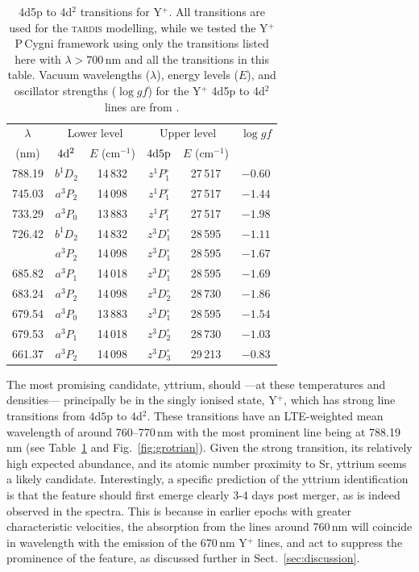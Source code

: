 \documentclass{aa}
\begin{document}
\begin{table}
\caption{4d5p to 4d\(^2\) transitions for Y\(^+\). All transitions are used for the \textsc{tardis} modelling, while we tested the Y\(^+\) P\,Cygni framework using only the transitions listed here with $\lambda>700$\,nm and all the transitions in this table. Vacuum wavelengths ($\lambda$), energy levels ($E$), and oscillator strengths ($\log{gf}$) for the Y\(^+\) 4d5p to 4d\(^2\) lines are from \citet{Biemont2011}.}\label{table:Yttrium}
\centering
\renewcommand{\arraystretch}{1.25} 
\begin{tabular}{@{}c|cc|cc|c@{}} \hline\hline %
$\lambda$ & \multicolumn{2}{|c|}{Lower level} & \multicolumn{2}{|c|}{Upper level} & $\log{gf}$ \\
 (nm) & $4{\rm d}^2$ & $E$ (cm$^{-1}$) & $4{\rm d}5{\rm p}$ & $E$ (cm$^{-1}$) & \\ \hline 
788.19  & $b^1 D_2$  & 14\,832  & $z^1 P_1^\circ$ & 27\,517 & $-0.60$ \\
745.03  & $a^3 P_2$  & 14\,098  & $z^1 P_1^\circ$ & 27\,517 & $-1.44$ \\
733.29  & $a^3 P_0$  & 13\,883  & $z^1 P_1^\circ$ & 27\,517 & $-1.98$ \\
726.42  & $b^1 D_2$  & 14\,832  & $z^3 D_1^\circ$ & 28\,595 & $-1.11$ \\[3pt]
\hdashline
689.60  & $a^3 P_2$  & 14\,098  & $z^3 D_1^\circ$ & 28\,595 & $-1.67$ \\
685.82  & $a^3 P_1$  & 14\,018  & $z^3 D_1^\circ$ & 28\,595 & $-1.69$ \\
683.24  & $a^3 P_2$  & 14\,098  & $z^3 D_2^\circ$ & 28\,730 & $-1.86$ \\ %
679.54  & $a^3 P_0$  & 13\,883  & $z^3 D_1^\circ$ & 28\,595 & $-1.54$ \\
679.53  & $a^3 P_1$  & 14\,018  & $z^3 D_2^\circ$ & 28\,730 & $-1.03$ \\ %
661.37  & $a^3 P_2$  & 14\,098  & $z^3 D_3^\circ$ & 29\,213 & $-0.83$ \\
\hline
\end{tabular}
\end{table}

The most promising candidate, yttrium, should ---at these temperatures and densities--- principally be in the singly ionised state, Y\(^+\), which has strong line transitions from $4$d$5$p to $4$d$^2$. These transitions have an LTE-weighted mean wavelength of around 760--770\,nm with the most prominent line being at 788.19\,nm (see Table~\ref{table:Yttrium} and Fig.~\ref{fig:grotrian}). Given the strong transition, its relatively high expected abundance, and its atomic number proximity to Sr, yttrium seems a likely candidate. Interestingly, a specific prediction of the yttrium identification is that the feature should first emerge clearly 3-4 days post merger, as is indeed observed in the spectra. This is because in earlier epochs with greater characteristic velocities, the absorption from the lines around 760\,nm will coincide in wavelength with the emission of the 670\,nm Y\(^+\) lines, and act to suppress the prominence of the feature, as discussed further in Sect.~\ref{sec:discussion}.
\end{document}
